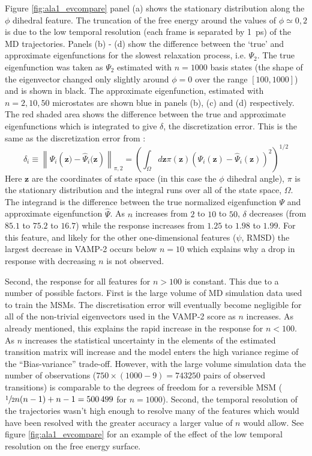 Figure \ref{fig:ala1_evcompare} panel (a) shows the stationary distribution along the $\phi$ dihedral feature.  The truncation of the free energy around the values of $\phi \simeq 0, 2$ is due to the low temporal resolution (each frame is separated by \SI{1}{\pico\second}) of the MD trajectories.  Panels (b) - (d) show the difference between the `true' and approximate eigenfunctions for the slowest relaxation process, i.e. $\Psi_{2}$. The true eigenfunction was taken as $\Psi_{2}$ estimated with $n=1000$ basis states (the shape of the eigenvector changed only slightly around $\phi=0$ over the range $[100, 1000]$) and is shown in black. The approximate eigenfunction, estimated with $n=2, 10, 50$ microstates are shown blue in panels (b), (c) and (d) respectively. The red shaded area shows the difference between the true and approximate eigenfunctions which is integrated to give $\delta$, the discretization error. This is the same as the discretization error from \cite{prinzMarkovModelsMolecular2011}:
\begin{equation}
    \delta_{i} \equiv\left\|\Psi_{i}\left(\mathbf{z})-\hat{\Psi}_{i}(\mathbf{z}\right)\right\|_{\pi, 2}=\left(\int_{\Omega} d \mathbf{z} \pi(\mathbf{z})(\Psi_{i}(\mathbf{z})-\hat{\Psi}_{i}(\mathbf{z}))^{2}\right)^{1 / 2}
\end{equation}
Here $\mathbf{z}$ are the coordinates of state space (in this case the $\phi$ dihedral angle), $\pi$ is the stationary distribution and the integral runs over all of the state space, $\Omega$. The integrand is the difference between the true normalized eigenfunction $\Psi$ and approximate eigenfunction $\hat{\Psi}$. As $n$ increases from $2$ to $10$ to $50$, $\delta$ decreases (from $85.1$ to $75.2$ to $16.7$) while the response increases from $1.25$ to $1.98$ to $1.99$. For this feature, and likely for the other one-dimensional features ($\psi$, RMSD) the largest decrease in VAMP-2 occurs below $n=10$ which explains why a drop in response with decreasing $n$ is not observed. 


Second, the response for all features for $n > 100$ is constant. This due to a number of possible factors. First is the large volume of MD simulation data used to train the MSMs. The discretisation error will eventually become negligible for all of the  non-trivial eigenvectors used in the VAMP-2 score as $n$ increases. As already mentioned, this explains the rapid increase in the response for $n<100$. As $n$ increases the statistical uncertainty in the elements of the estimated transition matrix will increase and the model enters the high variance regime of the ``Bias-variance'' trade-off.  However, with the large volume simulation data the number of observations ($750\times(1000-9) = \num{743250}$ pairs of observed transitions) is comparable to the degrees of freedom for a reversible MSM \cite{trendelkamp-schroerEstimationUncertaintyReversible2015b} ($\sfrac{1}{2}n(n-1)+n-1=\num{500499}$ for $n=1000$). Second, the temporal resolution of the trajectories wasn't high enough to resolve many of the features which would have been resolved with the greater accuracy a larger value of $n$ would allow. See figure \ref{fig:ala1_evcompare} for an example of the effect of the low temporal resolution on the free energy surface. 

